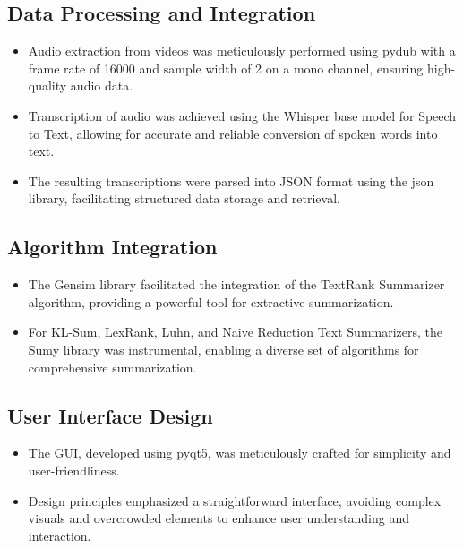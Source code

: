 \documentclass{ieeeaccess}
\begin{document}
\subsection{Data Processing and Integration}

\begin{itemize}
    \item {Audio extraction from videos was meticulously performed using pydub with a frame rate of 16000 and sample width of 2 on a mono channel, ensuring high-quality audio data.}
    \item {Transcription of audio was achieved using the Whisper base model for Speech to Text, allowing for accurate and reliable conversion of spoken words into text.}
    \item {The resulting transcriptions were parsed into JSON format using the json library, facilitating structured data storage and retrieval.}
\end{itemize}

\subsection{Algorithm Integration}

\begin{itemize}
    \item {The Gensim library facilitated the integration of the TextRank Summarizer algorithm, providing a powerful tool for extractive summarization.}
    \item {For KL-Sum, LexRank, Luhn, and Naive Reduction Text Summarizers, the Sumy library was instrumental, enabling a diverse set of algorithms for comprehensive summarization.}
\end{itemize}

\subsection{User Interface Design}

\begin{itemize}
    \item {The GUI, developed using pyqt5, was meticulously crafted for simplicity and user-friendliness.}
    \item {Design principles emphasized a straightforward interface, avoiding complex visuals and overcrowded elements to enhance user understanding and interaction.}
\end{itemize}
\end{document}
